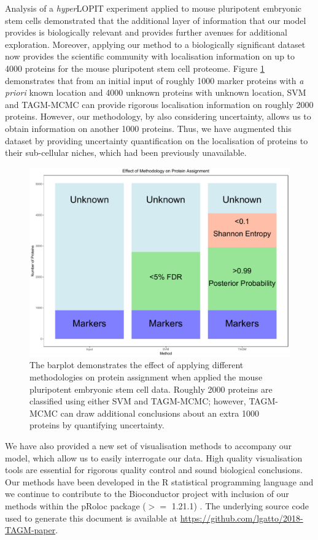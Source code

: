 \documentclass[12pt,english]{article}\usepackage[]{graphicx}\usepackage[]{color}
\begin{document}
Analysis of a \textit{hyper}LOPIT experiment applied to mouse
pluripotent embryonic stem cells demonstrated that the additional
layer of information that our model provides is biologically relevant
and provides further avenues for additional exploration. Moreover,
applying our method to a biologically significant dataset now provides
the scientific community with localisation information on up to 4000
proteins for the mouse pluripotent stem cell proteome. Figure
\ref{figure:ConcludePlot} demonstrates that from an initial input of
roughly 1000 marker proteins with \textit{a priori} known location and
4000 unknown proteins with unknown location, SVM and TAGM-MCMC can
provide rigorous localisation information on roughly 2000
proteins. However, our methodology, by also considering uncertainty,
allows us to obtain information on another 1000 proteins. Thus, we
have augmented this dataset by providing uncertainty quantification on
the localisation of proteins to their sub-cellular niches, which had
been previously unavailable.

\begin{figure}[h]

\centering
\includegraphics[width=.7\textwidth]{ConcludePlot.pdf}
\caption{The barplot demonstrates the effect of applying different
  methodologies on protein assignment when applied the mouse
  pluripotent embryonic stem cell data. Roughly 2000 proteins are
  classified using either SVM and TAGM-MCMC; however, TAGM-MCMC can
  draw additional conclusions about an extra 1000 proteins by
  quantifying uncertainty.}
\label{figure:ConcludePlot}
\end{figure}


We have also provided a new set of visualisation methods to accompany
our model, which allow us to easily interrogate our data. High quality
visualisation tools are essential for rigorous quality control and
sound biological conclusions.  Our methods have been developed in the
R statistical programming language and we continue to contribute to
the Bioconductor project \citep{Bioconductor::2004, Huber::2015} with
inclusion of our methods within the pRoloc package ($>=$ 1.21.1)
\citep{pRoloc:2014}. The underlying source code used to generate this
document is available at
\url{https://github.com/lgatto/2018-TAGM-paper}.
\end{document}

